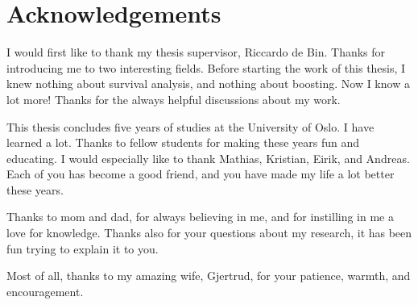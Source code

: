 \chapter{Acknowledgements}

I would first like to thank my thesis supervisor, Riccardo de Bin.
Thanks for introducing me to two interesting fields.
Before starting the work of this thesis, I knew nothing about survival analysis, and nothing about boosting.
Now I know a lot more!
Thanks for the always helpful discussions about my work.

This thesis concludes five years of studies at the University of Oslo.
I have learned a lot.
Thanks to fellow students for making these years fun and educating.
I would especially like to thank Mathias, Kristian, Eirik, and Andreas.
Each of you has become a good friend, and you have made my life a lot better these years.

Thanks to mom and dad, for always believing in me, and for instilling in me a love for knowledge.
Thanks also for your questions about my research, it has been fun trying to explain it to you.

Most of all, thanks to my amazing wife, Gjertrud, for your patience, warmth, and encouragement.
